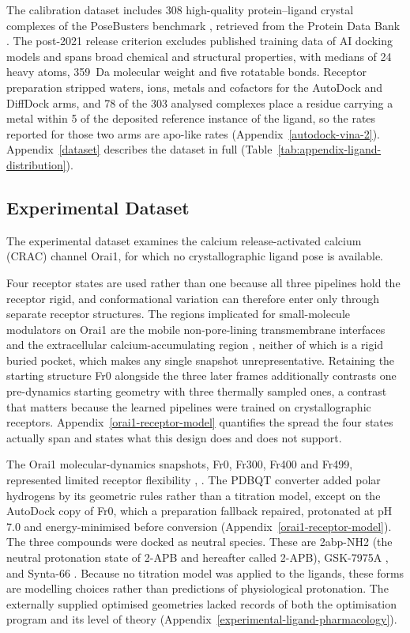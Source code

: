 The calibration dataset includes 308 high-quality protein--ligand crystal complexes of the PoseBusters benchmark \cite{ref035}, retrieved from the Protein Data Bank \cite{ref043}. The post-2021 release criterion excludes published training data of AI docking models and spans broad chemical and structural properties, with medians of 24 heavy atoms, 359~Da molecular weight and five rotatable bonds. Receptor preparation stripped waters, ions, metals and cofactors for the AutoDock and DiffDock arms, and 78 of the 303 analysed complexes place a residue carrying a metal within 5\angstrom{} of the deposited reference instance of the ligand, so the rates reported for those two arms are apo-like rates (Appendix~\ref{autodock-vina-2}). Appendix~\ref{dataset} describes the dataset in full (Table~\ref{tab:appendix-ligand-distribution}).

\hypertarget{experimental-dataset}{%
\subsection{Experimental Dataset}\label{experimental-dataset}}

The experimental dataset examines the calcium release-activated calcium (CRAC) channel Orai1, for which no crystallographic ligand pose is available.

Four receptor states are used rather than one because all three pipelines hold the receptor rigid, and conformational variation can therefore enter only through separate receptor structures. The regions implicated for small-molecule modulators on Orai1 are the mobile non-pore-lining transmembrane interfaces \cite{ref072} and the extracellular calcium-accumulating region \cite{ref038}, neither of which is a rigid buried pocket, which makes any single snapshot unrepresentative. Retaining the starting structure Fr0 alongside the three later frames additionally contrasts one pre-dynamics starting geometry with three thermally sampled ones, a contrast that matters because the learned pipelines were trained on crystallographic receptors. Appendix~\ref{orai1-receptor-model} quantifies the spread the four states actually span and states what this design does and does not support.

The Orai1 molecular-dynamics snapshots, Fr0, Fr300, Fr400 and Fr499, represented limited receptor flexibility \cite{ref038}, \cite{ref072}. The PDBQT converter added polar hydrogens by its geometric rules rather than a titration model, except on the AutoDock copy of Fr0, which a preparation fallback repaired, protonated at pH 7.0 and energy-minimised before conversion (Appendix~\ref{orai1-receptor-model}). The three compounds were docked as neutral species. These are 2abp-NH2 (the neutral protonation state of 2-APB and hereafter called 2-APB), GSK-7975A \cite{ref041}, \cite{ref070} and Synta-66 \cite{ref071}. Because no titration model was applied to the ligands, these forms are modelling choices rather than predictions of physiological protonation. The externally supplied optimised geometries lacked records of both the optimisation program and its level of theory (Appendix~\ref{experimental-ligand-pharmacology}).

